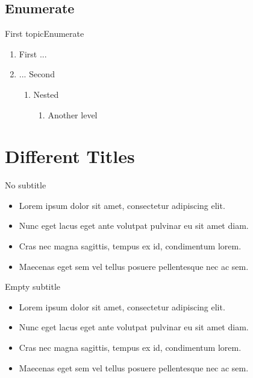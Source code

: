 \documentclass[aspectratio=169]{beamer}
\begin{document}
\subsection{Enumerate}
\begin{frame}{First topic}{Enumerate}
\begin{enumerate}
\item First ...
\item ... Second
\begin{enumerate}
\item Nested
\begin{enumerate}
\item Another level
\end{enumerate}
\end{enumerate}
\end{enumerate}
\end{frame}

\section{Different Titles}
\begin{frame}
\sectionpage
\end{frame}

\begin{frame}{No subtitle}
\begin{itemize}
	\item Lorem ipsum dolor sit amet, consectetur adipiscing elit.
	\item Nunc eget lacus eget ante volutpat pulvinar eu sit amet diam.
	\item Cras nec magna sagittis, tempus ex id, condimentum lorem.
	\item Maecenas eget sem vel tellus posuere pellentesque nec ac sem.
\end{itemize}
\end{frame}

\begin{frame}{Empty subtitle}{}
\begin{itemize}
	\item Lorem ipsum dolor sit amet, consectetur adipiscing elit.
	\item Nunc eget lacus eget ante volutpat pulvinar eu sit amet diam.
	\item Cras nec magna sagittis, tempus ex id, condimentum lorem.
	\item Maecenas eget sem vel tellus posuere pellentesque nec ac sem.
\end{itemize}
\end{frame}
\end{document}
